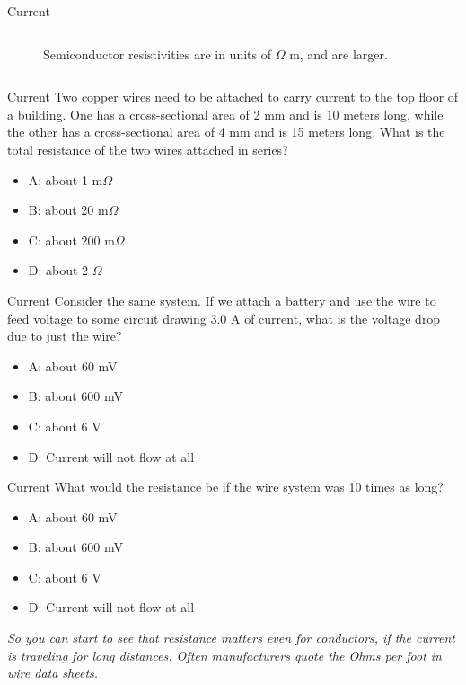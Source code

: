 \documentclass{beamer}
\begin{document}
\begin{frame}{Current}
\begin{columns}[T]
\begin{column}{0.5\textwidth}
\begin{figure}
\caption{\label{fig:rho2} Semiconductor resistivities are in units of $\Omega$ m, and are larger.}
\end{figure}
\end{column}
\end{columns}
\end{frame}

\begin{frame}{Current}
Two copper wires need to be attached to carry current to the top floor of a building.  One has a cross-sectional area of 2 mm and is 10 meters long, while the other has a cross-sectional area of 4 mm and is 15 meters long.  What is the total resistance of the two wires attached in series?
\begin{itemize}
\item A: about 1 m$\Omega$
\item B: about 20 m$\Omega$
\item C: about 200 m$\Omega$
\item D: about 2 $\Omega$
\end{itemize}
\end{frame}

\begin{frame}{Current}
Consider the same system.  If we attach a battery and use the wire to feed voltage to some circuit drawing 3.0 A of current, what is the voltage drop due to just the wire?
\begin{itemize}
\item A: about 60 mV
\item B: about 600 mV
\item C: about 6 V
\item D: Current will not flow at all
\end{itemize}
\end{frame}

\begin{frame}{Current}
What would the resistance be if the wire system was 10 times as long?
\begin{itemize}
\item A: about 60 mV
\item B: about 600 mV
\item C: about 6 V
\item D: Current will not flow at all
\end{itemize}
\textit{So you can start to see that resistance matters even for conductors, if the current is traveling for long distances.  Often manufacturers quote the Ohms per foot in wire data sheets.}
\end{frame}
\end{document}
